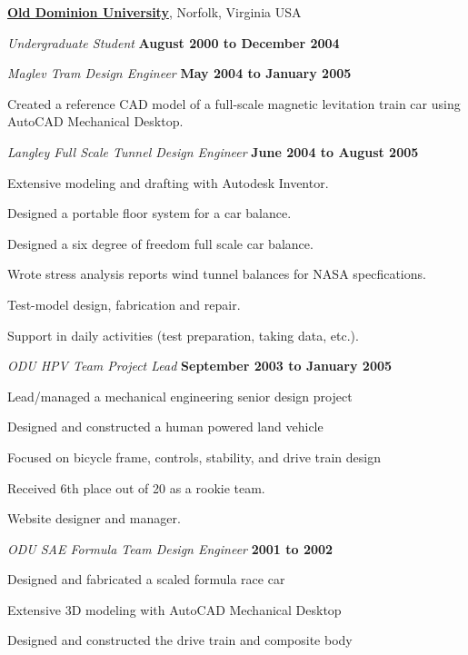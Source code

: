 \documentclass[10pt]{article}
\newenvironment{outerlist}[1][\enskip\textbullet]%
        {\begin{itemize}[#1]}{\end{itemize}%
         \vspace{-.6\baselineskip}}
\newenvironment{innerlist}[1][\enskip\textbullet]%
        {\begin{compactitem}[#1]}{\end{compactitem}}
\begin{document}
\href{http://www.odu.edu}{\textbf{Old Dominion University}}, Norfolk, Virginia USA
\begin{outerlist}
\item[] \textit{Undergraduate Student}%
        \hfill \textbf{August 2000 to December 2004}

\item[] \textit{Maglev Tram Design Engineer}%
        \hfill \textbf{May 2004 to January 2005}
        \begin{innerlist}
\item Created a reference CAD model of a full-scale magnetic levitation train car using AutoCAD Mechanical Desktop.
\end{innerlist}

\item[] \textit{Langley Full Scale Tunnel Design Engineer}%
        \hfill \textbf{June 2004 to August 2005}
        \begin{innerlist}
  \item Extensive modeling and drafting with Autodesk Inventor.
  \item Designed a portable floor system for a car balance.
\item Designed a six degree of freedom full scale car balance.
\item Wrote stress analysis reports wind tunnel balances for NASA specfications.
\item Test-model design, fabrication and repair.
\item Support in daily activities (test preparation, taking data, etc.).
\end{innerlist}

\item[] \textit{ODU HPV Team Project Lead}%
        \hfill \textbf{September 2003 to January 2005}
        \begin{innerlist}
\item Lead/managed a mechanical engineering senior design project
\item Designed and constructed a human powered land vehicle
\item Focused on bicycle frame, controls, stability, and drive train design
\item Received 6th place out of 20 as a rookie team.
\item Website designer and manager.
\end{innerlist}

\item[] \textit{ODU SAE Formula Team Design Engineer}%
        \hfill \textbf{2001 to 2002}
        \begin{innerlist}
\item Designed and fabricated a scaled formula race car
\item Extensive 3D modeling with AutoCAD Mechanical Desktop
\item Designed and constructed the drive train and composite body
\end{innerlist}

\end{outerlist}
\end{document}
